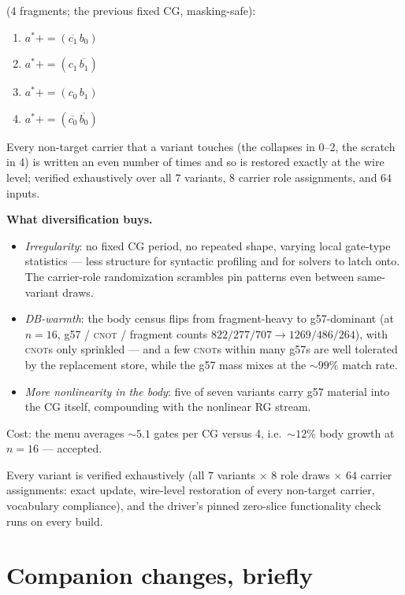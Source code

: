\documentclass[11pt]{article}
\newcommand{\CNOT}{\textsc{cnot}}
\newcommand{\pe}{\mathrel{{+}{=}}}    %
\newcommand{\at}{a^{\ast}}            %
\begin{document}
 (4 fragments; the previous fixed CG, masking-safe):
\begin{enumerate}\itemsep1pt
\item $\at \pe (\overline{c_1}\, b_0)$
\item $\at \pe (c_1\, \overline{b_1})$
\item $\at \pe (c_0\, b_1)$
\item $\at \pe (\overline{c_0}\, \overline{b_0})$ 
\end{enumerate}

\smallskip
Every non-target carrier that a variant touches (the collapses in 0--2, the
scratch in 4) is written an even number of times and so is restored exactly
at the wire level; verified exhaustively over all $7$ variants, $8$ carrier
role assignments, and $64$ inputs.

\textbf{What diversification buys.}
\begin{itemize}
\item \emph{Irregularity}: no fixed CG period, no repeated shape, varying
local gate-type statistics --- less structure for syntactic profiling and
for solvers to latch onto. The carrier-role randomization scrambles pin
patterns even between same-variant draws.
\item \emph{DB-warmth}: the body census flips from fragment-heavy to
g57-dominant (at $n{=}16$, g57 / \CNOT{} / fragment counts $822/277/707
\to 1269/486/264$), with \CNOT{}s only sprinkled --- and a few \CNOT{}s
within many g57s are well tolerated by the replacement store, while the
g57 mass mixes at the ${\sim}99\%$ match rate.
\item \emph{More nonlinearity in the body}: five of seven variants carry
g57 material into the CG itself, compounding with the nonlinear RG stream.
\end{itemize}

Cost: the menu averages ${\sim}5.1$ gates per CG versus 4, i.e.\
${\sim}12\%$ body growth at $n{=}16$ --- accepted.

Every variant is verified exhaustively (all $7$ variants $\times$ $8$ role
draws $\times$ $64$ carrier assignments: exact update, wire-level
restoration of every non-target carrier, vocabulary compliance), and the
driver's pinned zero-slice functionality check runs on every build.

\section{Companion changes, briefly}
\end{document}
